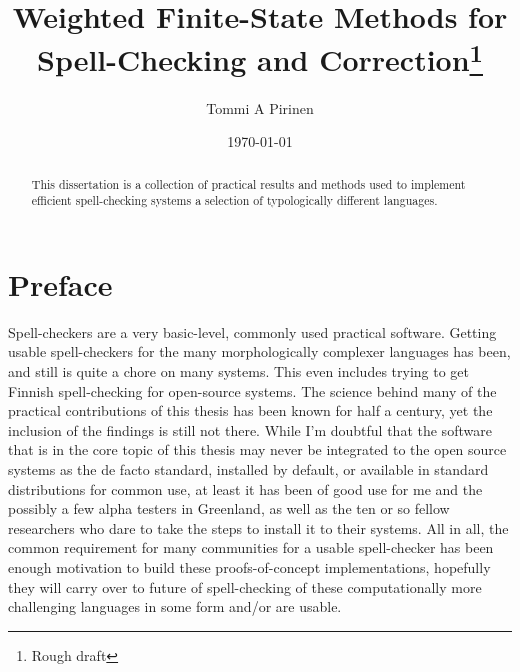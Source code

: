 \documentclass[officiallayout,draft]{unihelcompling}
\title{Weighted Finite-State Methods for 
Spell-Checking
and Correction\footnote{Rough draft}}
\author{Tommi A Pirinen}
\date{\today}
\begin{document}
\frontmatter

\maketitle

\begin{abstract}
    This dissertation is a collection of practical results and methods used
    to implement efficient spell-checking systems a selection of typologically
    different languages.
\end{abstract}

\tableofcontents

\listoftodos

\mainmatter

\chapter*{Preface}
\label{chap:preface}

Spell-checkers are a very basic-level, commonly used practical software.
Getting usable spell-checkers for the many morphologically complexer languages
has been, and still is quite a chore on many systems. This even includes trying
to get Finnish spell-checking for open-source systems. The science behind many
of the practical contributions of this thesis has been known for half a
century, yet the inclusion of the findings is still not there.  While I'm
doubtful that the software that is in the core topic of this thesis may never
be integrated to the open source systems as the de facto standard, installed by
default, or available in standard distributions for common use, at least it has
been of good use for me and the possibly a few alpha testers in Greenland, as
well as the ten or so fellow researchers who dare to take the steps to install
it to their systems.  All in all, the common requirement for many communities
for a usable spell-checker has been enough motivation to build these
proofs-of-concept implementations, hopefully they will carry over to future of
spell-checking of these computationally more challenging languages in some form
and/or are usable.
\end{document}
